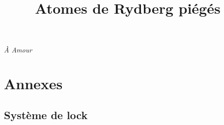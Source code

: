 \documentclass[11pt,a4paper,twoside]{book}
\title{Atomes de Rydberg piégés}
\renewcommand{\chaptermark}[1]{\markboth{Chapitre {\thechapter}. #1}{}}
\renewcommand \thechapter{\Roman{chapter}}
\begin{document}
\frontmatter
{}
\thispagestyle{empty}
\vspace*{0.2\textheight}
\begin{flushright}
\emph{\`A Amour}
\end{flushright}
\vspace*{\fill}\clearpage
\makeatletter
\let\ps@plain\ps@empty

\makeatother

\dominitoc
\tableofcontents
\thispagestyle{fancyplain}
\listoffigures \mtcaddchapter
\listoftables \mtcaddchapter
\thispagestyle{fancyplain}
\mainmatter
{}
















\part*{Annexes}
\appendix
\renewcommand{\chaptermark}[1]{\markboth{\appendixname\ \thechapter: #1}{}}
\chapter{Système de lock}\label{app:laserlock}
\end{document}
